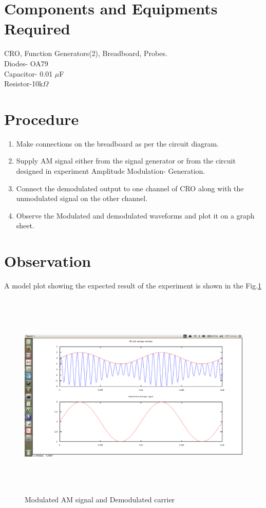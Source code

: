 \documentclass{book}
\begin{document}
\section*{Components and Equipments Required}
CRO, Function Generators(2), Breadboard, Probes.
\\Diodes- OA79
\\Capacitor- 0.01 $\mu$F
\\Resistor-10k$\Omega$
\section*{Procedure}

\begin{enumerate}
\item
Make connections on the breadboard as per the circuit diagram.
\item
Supply AM signal either from the signal generator or from the circuit designed in experiment Amplitude Modulation- Generation. 
\item
Connect the demodulated output to one channel of CRO along with the unmodulated signal on the other channel.
\item
Observe the Modulated and demodulated waveforms and plot it on a graph sheet.
\end{enumerate}
\section*{Observation}
A model plot showing the expected result of the experiment is shown in the Fig.\ref{AMdemod}
\begin{figure}
\includegraphics[width=12cm, height=10cm, trim= 2cm 1cm 1cm 1cm,clip=true]{AMdemod.png}
\caption{Modulated AM signal and Demodulated carrier}
\label{AMdemod}
\end{figure}
\end{document}
